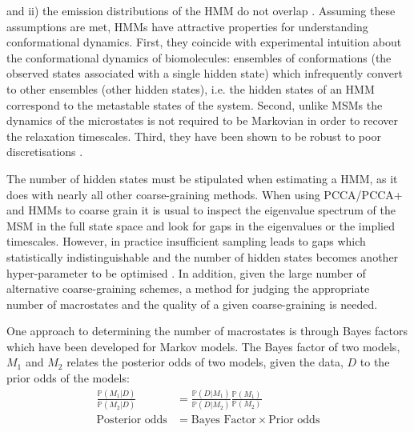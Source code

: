 and ii) the emission distributions of the HMM do not overlap \cite{noeProjectedHiddenMarkov2013a}. Assuming these assumptions are met, HMMs have attractive properties for understanding conformational dynamics.  First, they coincide with experimental intuition about the conformational dynamics of biomolecules:  ensembles of conformations (the observed states associated with a single hidden state) which infrequently convert to other ensembles (other hidden states), i.e. the hidden states of an HMM correspond to the metastable states of the system. Second, unlike MSMs the dynamics of the microstates is not required to be Markovian in order to recover the relaxation timescales. Third, they have been shown to be robust to poor discretisations \cite{noeProjectedHiddenMarkov2013a}.

The number of hidden states must be stipulated when estimating a HMM, as it does with nearly all other coarse-graining methods. When using PCCA/PCCA+ \cite{deuflhardIdentificationAlmostInvariant2000a}\cite{deuflhardRobustPerronCluster2005b} and HMMs \cite{noeProjectedHiddenMarkov2013a} to coarse grain it is usual to inspect the eigenvalue spectrum of the MSM in the full state space and look for gaps in the eigenvalues or the implied timescales. However, in practice insufficient sampling leads to gaps which statistically indistinguishable and the number of hidden states becomes another hyper-parameter to be optimised \cite{bowmanQuantitativeComparisonAlternative2013}. In addition, given the large number of alternative coarse-graining schemes, a method for judging the appropriate number of macrostates and the quality of a given coarse-graining  is needed. 

One approach to determining the number of macrostates is through Bayes factors \cite{kassBayesFactors1995} which have been developed \cite{bacalladoBayesianComparisonMarkov2009a} for Markov models. The Bayes factor of two models, $M_{1}$ and $M_{2}$ relates the posterior odds of two models, given the data, $D$ to the prior odds of the models: 
\begin{equation}
   \begin{split}
    \frac{\mathbb{P}(M_1|D)}{\mathbb{P}(M_2|D)} & = \frac{\mathbb{P}(D|M_1)}{\mathbb{P}(D|M_2)} \frac{\mathbb{P}(M_1)}{\mathbb{P}(M_2)}\\
     \text{Posterior odds} &= \text{Bayes Factor} \times \text{Prior odds}
\end{split} 
\end{equation}


